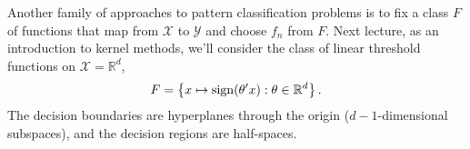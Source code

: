 \documentclass[twoside]{article}
\theoremstyle{definition}
\theoremstyle{definition}
\theoremstyle{remark}
\def\R{{\mathbb R}}
\def\X{{\mathcal X}}
\def\Y{{\mathcal Y}}
\def\sign{{\rm sign}}
\begin{document}
Another family of approaches to pattern classification problems is to
fix a class $F$ of functions that map from $\X$ to $\Y$ and choose
$f_n$ from $F$. Next lecture, as an introduction to kernel methods,
we'll consider the class of linear threshold functions on $\X=\R^d$,
  \[
    F = \left\{ x\mapsto \sign(\theta'x) : \theta\in\R^d \right\}.
  \]
The decision boundaries are hyperplanes through the origin
($d-1$-dimensional subspaces), and the decision
regions are half-spaces.
\end{document}
